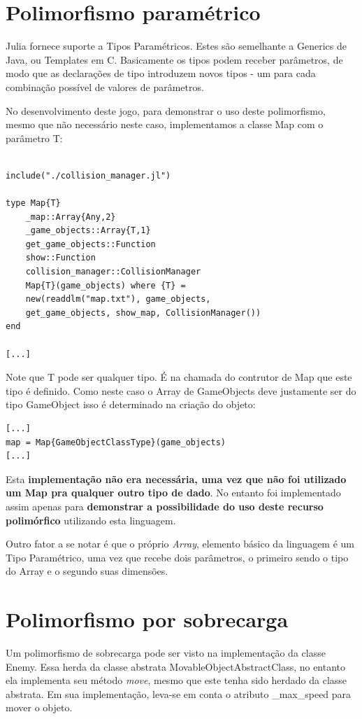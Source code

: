 \documentclass[rel_mlp]{iiufrgs}
\begin{document}
\section{Polimorfismo paramétrico}

Julia fornece suporte a Tipos Paramétricos. Estes são semelhante a Generics de Java, ou Templates em C. Basicamente os tipos podem receber parâmetros, de modo que as declarações de tipo introduzem novos tipos - um para cada combinação possível de valores de parâmetros.

No desenvolvimento deste jogo, para demonstrar o uso deste polimorfismo, mesmo que não necessário neste caso, implementamos a classe Map com o parâmetro T:
\begin{lstlisting}[frame=single]

include("./collision_manager.jl")

type Map{T} 
    _map::Array{Any,2}
    _game_objects::Array{T,1}
    get_game_objects::Function
    show::Function
    collision_manager::CollisionManager
    Map{T}(game_objects) where {T} = 
    new(readdlm("map.txt"), game_objects, 
    get_game_objects, show_map, CollisionManager())
end

[...]
\end{lstlisting}

Note que T pode ser qualquer tipo. É na chamada do contrutor de Map que este tipo é definido. Como neste caso o Array de GameObjects deve justamente ser do tipo GameObject isso é determinado na criação do objeto:
\begin{lstlisting}[frame=single]
[...]
map = Map{GameObjectClassType}(game_objects)
[...]
\end{lstlisting}

Esta \textbf{implementação não era necessária, uma vez que não foi utilizado um Map pra qualquer outro tipo de dado}. No entanto foi implementado assim apenas para \textbf{demonstrar a possibilidade do uso deste recurso polimórfico} utilizando esta linguagem.

Outro fator a se notar é que o próprio \textit{Array}, elemento básico da linguagem é um Tipo Paramétrico, uma vez que recebe dois parâmetros, o primeiro sendo o tipo do Array e o segundo suas dimensões. 

\section{Polimorfismo por sobrecarga}

Um polimorfismo de sobrecarga pode ser visto na implementação da classe Enemy. Essa herda da classe abstrata MovableObjectAbstractClass, no entanto ela implementa seu método \textit{move}, mesmo que este tenha sido herdado da classe abstrata. Em sua implementação, leva-se em conta o atributo _max_speed para mover o objeto.
\end{document}
